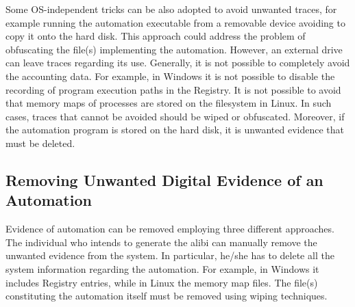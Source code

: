 \documentclass[runningheads]{llncs}
\begin{document}
Some OS-independent tricks can be also adopted to avoid unwanted traces, for example running the automation executable from a removable device avoiding to copy it onto the hard disk. This approach could address the problem of obfuscating the file(s) implementing the automation. However, an external drive can leave traces regarding its use.
Generally, it is not possible to completely avoid the accounting data. For example, in Windows it is not possible to disable the recording of program execution paths in the Registry. It is not possible to avoid that memory maps of processes are stored on the filesystem in Linux. In such cases, traces that cannot be avoided should be wiped or obfuscated. Moreover, if the automation program is stored on the hard disk, it is unwanted evidence that must be deleted. 

\subsection{Removing Unwanted Digital Evidence of an Automation}
\label{sub:remevid}


Evidence of automation can be removed employing three different approaches.\\

The individual who intends to generate the alibi can manually remove the unwanted evidence from the system. In particular, he/she has to delete all the system information regarding the automation. For example, in Windows it includes Registry entries, while in Linux the memory map files. The file(s) constituting the automation itself must be removed using wiping techniques.
\end{document}
